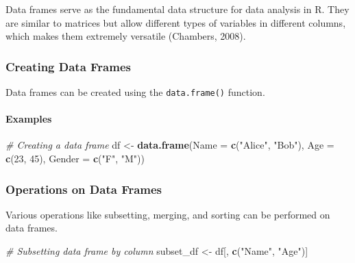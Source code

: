 \documentclass[
]{book}
\newenvironment{Shaded}{\begin{snugshade}}{\end{snugshade}}
\newcommand{\AttributeTok}[1]{\textcolor[rgb]{0.13,0.29,0.53}{#1}}
\newcommand{\CommentTok}[1]{\textcolor[rgb]{0.56,0.35,0.01}{\textit{#1}}}
\newcommand{\DecValTok}[1]{\textcolor[rgb]{0.00,0.00,0.81}{#1}}
\newcommand{\FunctionTok}[1]{\textcolor[rgb]{0.13,0.29,0.53}{\textbf{#1}}}
\newcommand{\NormalTok}[1]{#1}
\newcommand{\OtherTok}[1]{\textcolor[rgb]{0.56,0.35,0.01}{#1}}
\newcommand{\StringTok}[1]{\textcolor[rgb]{0.31,0.60,0.02}{#1}}
\begin{document}
Data frames serve as the fundamental data structure for data analysis in R. They are similar to matrices but allow different types of variables in different columns, which makes them extremely versatile (Chambers, 2008).

\hypertarget{creating-data-frames}{%
\subsubsection*{Creating Data Frames}\label{creating-data-frames}}

Data frames can be created using the \texttt{data.frame()} function.

\hypertarget{examples-4}{%
\paragraph*{Examples}\label{examples-4}}

\begin{Shaded}
\begin{Highlighting}[]
\CommentTok{\# Creating a data frame}
\NormalTok{df }\OtherTok{\textless{}{-}} \FunctionTok{data.frame}\NormalTok{(}\AttributeTok{Name =} \FunctionTok{c}\NormalTok{(}\StringTok{"Alice"}\NormalTok{, }\StringTok{"Bob"}\NormalTok{), }\AttributeTok{Age =} \FunctionTok{c}\NormalTok{(}\DecValTok{23}\NormalTok{, }\DecValTok{45}\NormalTok{), }\AttributeTok{Gender =} \FunctionTok{c}\NormalTok{(}\StringTok{"F"}\NormalTok{, }\StringTok{"M"}\NormalTok{))}
\end{Highlighting}
\end{Shaded}

\hypertarget{operations-on-data-frames}{%
\subsubsection*{Operations on Data Frames}\label{operations-on-data-frames}}

Various operations like subsetting, merging, and sorting can be performed on data frames.

\begin{Shaded}
\begin{Highlighting}[]
\CommentTok{\# Subsetting data frame by column}
\NormalTok{subset\_df }\OtherTok{\textless{}{-}}\NormalTok{ df[, }\FunctionTok{c}\NormalTok{(}\StringTok{"Name"}\NormalTok{, }\StringTok{"Age"}\NormalTok{)]}
\end{Highlighting}
\end{Shaded}
\end{document}
